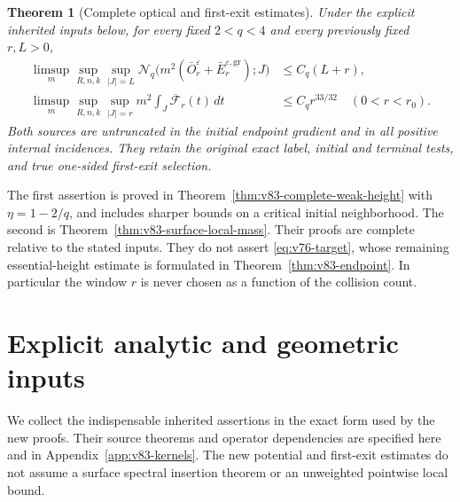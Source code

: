 \documentclass[11pt,reqno]{amsart}
\numberwithin{equation}{section}
\newtheorem{theorem}{Theorem}[section]
\theoremstyle{definition}\newtheorem{definition}[theorem]{Definition}
\theoremstyle{remark}\newtheorem{remark}[theorem]{Remark}
\theoremstyle{definition}\newtheorem{inputstatement}[theorem]{Input statement}
\begin{document}
\begin{theorem}[Complete optical and first-exit estimates]
\label{thm:v83-main}
Under the explicit inherited inputs below, for every fixed $2<q<4$
and every previously fixed $r,L>0$,
\begin{align}
 \limsup_m\sup_{R,n,k}\sup_{|J|=L}
 \mathcal N_q\bigl(m^2(\bar O_r^\varepsilon+
             \bar E_r^{\varepsilon,\mathrm{gr}});J\bigr)
                                     &\le C_q(L+r),\label{eq:v83-main-optical}\\
 \limsup_m\sup_{R,n,k}\sup_{|J|=r}
           m^2\int_J\overline{\mathcal F}_r(t)\,dt
                                     &\le C_q r^{33/32}
                               \quad(0<r<r_0).\label{eq:v83-main-surface}
\end{align}
Both sources are untruncated in the initial endpoint gradient and in
all positive internal incidences. They retain the original exact label,
initial and terminal tests, and true one-sided first-exit selection.
\end{theorem}
The first assertion is proved in Theorem~\ref{thm:v83-complete-weak-height}
with $\eta=1-2/q$, and includes sharper bounds on a critical initial
neighborhood. The second is Theorem~\ref{thm:v83-surface-local-mass}.
Their proofs are complete relative to the stated inputs. They do not
assert \eqref{eq:v76-target}, whose remaining essential-height estimate
is formulated in Theorem~\ref{thm:v83-endpoint}. In particular the
window $r$ is never chosen as a function of the collision count.

\section{Explicit analytic and geometric inputs}
We collect the indispensable inherited assertions in the exact form
used by the new proofs. Their source theorems and operator dependencies
are specified here and in Appendix~\ref{app:v83-kernels}. The new
potential and first-exit estimates do not assume a surface spectral
insertion theorem or an unweighted pointwise local bound.
\end{document}
